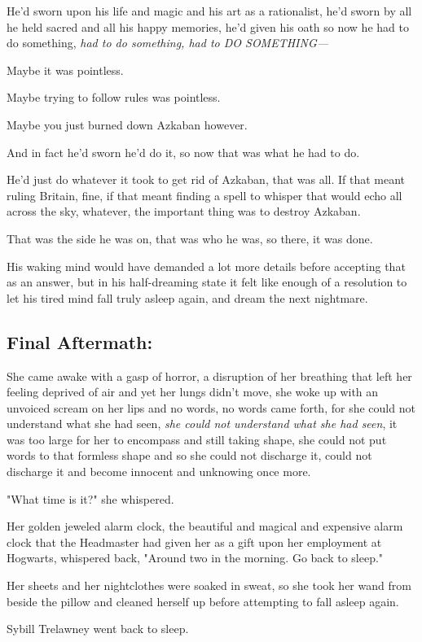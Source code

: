 He'd sworn upon his life and magic and his art as a rationalist, he'd sworn by
all he held sacred and all his happy memories, he'd given his oath so now he
had to do something, \emph{had to do something, had to DO SOMETHING---}

Maybe it was pointless.

Maybe trying to follow rules was pointless.

Maybe you just burned down Azkaban however.

And in fact he'd sworn he'd do it, so now that was what he had to do.

He'd just do whatever it took to get rid of Azkaban, that was all. If that
meant ruling Britain, fine, if that meant finding a spell to whisper that would
echo all across the sky, whatever, the important thing was to destroy Azkaban.

That was the side he was on, that was who he was, so there, it was done.

His waking mind would have demanded a lot more details before accepting that as
an answer, but in his half-dreaming state it felt like enough of a resolution
to let his tired mind fall truly asleep again, and dream the next nightmare.
\sbreak
\subsection{Final Aftermath:}

She came awake with a gasp of horror, a disruption of her breathing that left
her feeling deprived of air and yet her lungs didn't move, she woke up with an
unvoiced scream on her lips and no words, no words came forth, for she could
not understand what she had seen, \emph{she could not understand what she had
seen}, it was too large for her to encompass and still taking shape, she could
not put words to that formless shape and so she could not discharge it, could
not discharge it and become innocent and unknowing once more.

"What time is it?" she whispered.

Her golden jeweled alarm clock, the beautiful and magical and expensive alarm
clock that the Headmaster had given her as a gift upon her employment at
Hogwarts, whispered back, "Around two in the morning. Go back to sleep."

Her sheets and her nightclothes were soaked in sweat, so she took her
wand from beside the pillow and cleaned herself up before attempting
to fall asleep again.

Sybill Trelawney went back to sleep.

